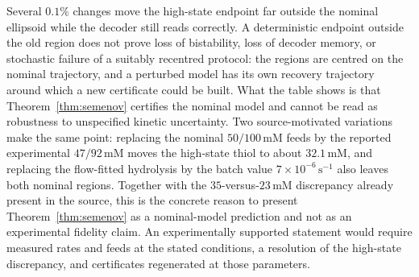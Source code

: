 Several $0.1\%$ changes move the high-state endpoint far outside the nominal ellipsoid while the decoder still reads correctly. A deterministic endpoint outside the old region does not prove loss of bistability, loss of decoder memory, or stochastic failure of a suitably recentred protocol: the regions are centred on the nominal trajectory, and a perturbed model has its own recovery trajectory around which a new certificate could be built. What the table shows is that Theorem~\ref{thm:semenov} certifies the nominal model and cannot be read as robustness to unspecified kinetic uncertainty. Two source-motivated variations make the same point: replacing the nominal $50/100$\,mM feeds by the reported experimental $47/92$\,mM moves the high-state thiol to about $32.1$\,mM, and replacing the flow-fitted hydrolysis by the batch value $7\times10^{-6}\,\mathrm s^{-1}$ also leaves both nominal regions. Together with the $35$-versus-$23$\,mM discrepancy already present in the source, this is the concrete reason to present Theorem~\ref{thm:semenov} as a nominal-model prediction and not as an experimental fidelity claim. An experimentally supported statement would require measured rates and feeds at the stated conditions, a resolution of the high-state discrepancy, and certificates regenerated at those parameters.
